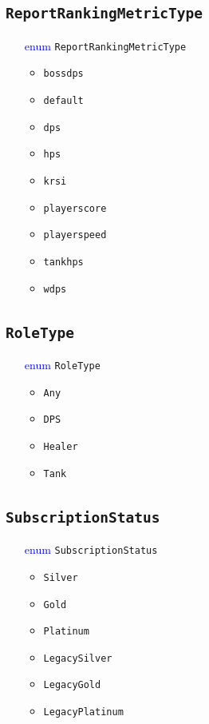 \documentclass[10pt, a4paper]{memoir}
\numberwithin{equation}{section}
\theoremstyle{plain}
\theoremstyle{defp}
\theoremstyle{dotless}
\theoremstyle{definition}
\theoremstyle{dotless}
\theoremstyle{dotless}
\theoremstyle{defp}
\theoremstyle{defp}
\theoremstyle{be}          %
\theoremstyle{defp}
\newcommand\ttt[1]{\texttt{#1}}
\begin{document}
\subsection{\ttt{ReportRankingMetricType}}\label{sec:ReportRankingMetricType}
\begin{itemize}[noitemsep,topsep=1pt]
\item[\textcolor{blue}{enum}] \ttt{ReportRankingMetricType}
\begin{itemize}[itemsep=1pt,topsep=1pt]
\item \ttt{bossdps}
\item \ttt{default}
\item \ttt{dps}
\item \ttt{hps}
\item \ttt{krsi}
\item \ttt{playerscore}
\item \ttt{playerspeed}
\item \ttt{tankhps}
\item \ttt{wdps}
\end{itemize}
\end{itemize}


\subsection{\ttt{RoleType}}\label{sec:RoleType}
\begin{itemize}[noitemsep,topsep=1pt]
\item[\textcolor{blue}{enum}] \ttt{RoleType}
\begin{itemize}[itemsep=1pt,topsep=1pt]
\item \ttt{Any}
\item \ttt{DPS}
\item \ttt{Healer}
\item \ttt{Tank}
\end{itemize}
\end{itemize}


\subsection{\ttt{SubscriptionStatus}}\label{sec:SubscriptionStatus}
\begin{itemize}[noitemsep,topsep=1pt]
\item[\textcolor{blue}{enum}] \ttt{SubscriptionStatus}
\begin{itemize}[itemsep=1pt,topsep=1pt]
\item \ttt{Silver}
\item \ttt{Gold}
\item \ttt{Platinum}
\item \ttt{LegacySilver}
\item \ttt{LegacyGold}
\item \ttt{LegacyPlatinum}
\end{itemize}
\end{itemize}
\end{document}
